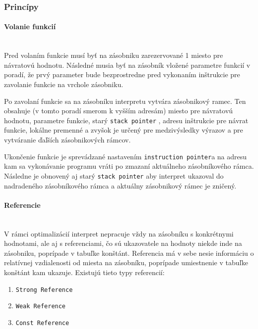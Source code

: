 \documentclass[12pt,a4paper,titlepage,final]{article}
\begin{document}
\subsubsection{Princípy}

\paragraph{Volanie funkcií}\mbox{}\\

Pred volaním funkcie musí byť na zásobniku zarezervované 1 miesto pre návratovú hodnotu.
Následné musia byť na zásobník vložené parametre funkcií v poradí, že prvý parameter bude
bezprostredne pred vykonaním inštrukcie pre zavolanie funkcie na vrchole zásobniku.

Po zavolaní funkcie sa na zásobníku interpretu vytvára zásobnikový ramec. Ten obsahuje (v tomto
poradí smerom k vyšším adresám) miesto pre návratovú hodnotu, parametre funkcie, starý \texttt{stack pointer}
, adresu inštrukcie pre návrat funkcie, lokálne premenné a zvyšok je určený pre medzivýsledky výrazov
a pre vytváranie ďaľších zásobnikových rámcov.

Ukončenie funkcie je sprevádzané nastavením \texttt{instruction pointer}a na adresu kam sa vykonávanie
programu vráti po zmazaní aktuálneho zásobníkového rámca. Následne je obnovený aj starý \texttt{stack
pointer} aby interpret ukazoval do nadradeného zásobníkového rámca a aktuálny zásobnikový
rámec je zničený.

\paragraph{Referencie}\mbox{}\\

V rámci optimalizácií interpret nepracuje vždy na zásobníku s konkrétnymi hodnotami,
ale aj s referenciami, čo sú ukazovatele na hodnoty niekde inde na zásobniku, poprípade
v tabuľke konštánt. Referencia má v sebe nesie informáciu o relatívnej vzdialenosti od miesta
na zásobníku, poprípade umiestnenie v tabuľke konštánt kam ukazuje. Existujú tieto typy referencií:

\begin{enumerate}
    \itemsep0em
    \item \texttt{Strong Reference}
    \item \texttt{Weak Reference}
    \item \texttt{Const Reference}
\end{enumerate}
\end{document}
